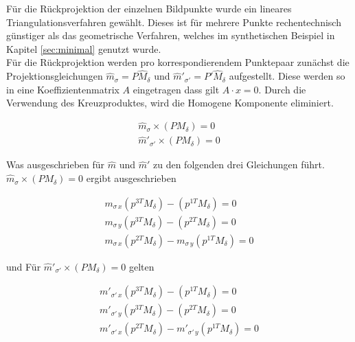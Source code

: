 Für die Rückprojektion der einzelnen Bildpunkte wurde ein lineares Triangulationsverfahren gewählt\cite{HZ}. Dieses ist für mehrere Punkte rechentechnisch günstiger als das geometrische Verfahren, welches im synthetischen Beispiel in Kapitel \ref{sec:minimal} genutzt wurde.\\

Für die Rückprojektion werden pro korrespondierendem Punktepaar zunächst die Projektionsgleichungen  $\hat{m}_\sigma = P\hat{M}_\delta$ und $\hat{m}'_{\sigma'}  = P'\hat{M}_\delta$ aufgestellt. Diese werden so in eine Koeffizientenmatrix $A$ eingetragen dass gilt $A\cdot x = 0$. Durch die Verwendung des Kreuzproduktes, wird die Homogene Komponente eliminiert\cite{HZ}. 




\begin{gather}
	\hat{m}_\sigma \times (PM_\delta) = 0\\
	\hat{m}'_{\sigma'} \times (PM_\delta) = 0
\end{gather}

Was ausgeschrieben für $\hat{m}$ und $\hat{m}'$ zu den folgenden drei Gleichungen führt. $\hat{m}_\sigma \times (PM_\delta) = 0$ ergibt ausgeschrieben

\begin{gather}
m_{\sigma\,x}(p^{3T}M_\delta) - (p^{1T}M_\delta)=0\\
m_{\sigma\,y}(p^{3T}M_\delta) - (p^{2T}M_\delta)=0\\
m_{\sigma\,x}(p^{2T}M_\delta) - m_{\sigma\,y}(p^{1T}M_\delta)=0
\end{gather}

und Für $\hat{m}'_{\sigma'} \times (PM_\delta) = 0$ gelten


\begin{gather}
	m'_{\sigma'\,x}(p^{3T}M_\delta) - (p^{1T}M_\delta)=0\\
	m'_{\sigma'\,y}(p^{3T}M_\delta) - (p^{2T}M_\delta)=0\\
	m'_{\sigma'\,x}(p^{2T}M_\delta) - m'_{\sigma'\,y}(p^{1T}M_\delta)=0
\end{gather}

